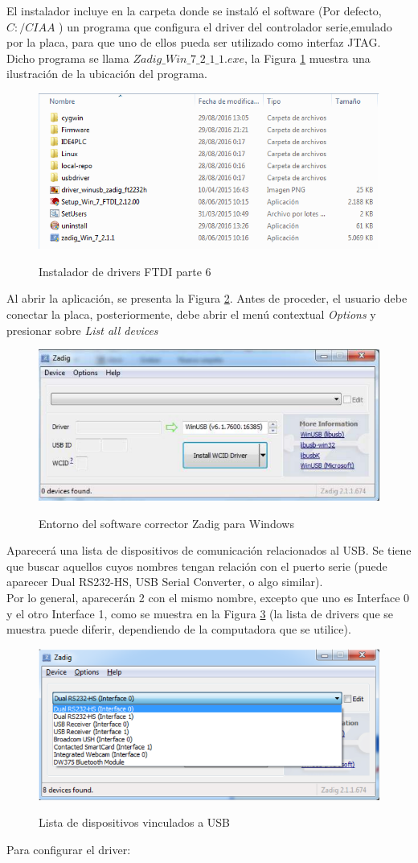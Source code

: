 \documentclass[12pt,letterpaper]{article}
\begin{document}
El instalador incluye en la carpeta donde se instaló el software (Por defecto, $ C:/CIAA $ ) un programa que configura el driver del controlador serie,emulado por la placa, para que uno de ellos pueda ser utilizado como interfaz JTAG. Dicho programa se llama $ Zadig\_Win\_7\_2\_1\_1.exe $, la Figura \ref{Fig14} muestra una ilustración de la ubicación del programa.

\begin{figure}[!h]
\centering
\includegraphics[width=6 cm]{figuras/instalacion12.png}\\
\caption{Instalador de drivers FTDI parte 6}
\label{Fig14}
\end{figure}
Al abrir la aplicación, se presenta la Figura \ref{Fig15}. Antes de proceder, el usuario debe conectar la placa, posteriormente, debe abrir el menú contextual \textit{Options} y presionar sobre \textit{List all devices}

\begin{figure}[!h]
\centering
\includegraphics[width=6 cm]{figuras/instalacion13.png}\\
\caption{Entorno del software corrector Zadig para Windows}
\label{Fig15}
\end{figure}
Aparecerá una lista de dispositivos de comunicación relacionados al USB. Se tiene que buscar aquellos cuyos nombres tengan relación con el puerto serie (puede aparecer Dual RS232-HS, USB Serial Converter, o algo similar).
 \\
 
Por lo general, aparecerán 2 con el mismo nombre, excepto que uno es Interface 0 y el otro Interface 1, como se muestra en la Figura \ref{Fig16} (la lista de drivers que se muestra puede diferir, dependiendo de la computadora que se utilice).

\begin{figure}[!h]
\centering
\includegraphics[width=8 cm]{figuras/instalacion14.png}\\
\caption{Lista de dispositivos vinculados a USB}
\label{Fig16}
\end{figure}
Para configurar el driver:
\end{document}
